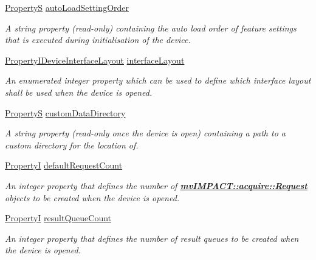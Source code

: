 \begin{DoxyCompactItemize}
\hyperlink{classmv_i_m_p_a_c_t_1_1acquire_1_1_property_s}{Property\+S} \hyperlink{classmv_i_m_p_a_c_t_1_1acquire_1_1_device_a3130a245e1dc22be91511ce6a6bdf957}{auto\+Load\+Setting\+Order}
\begin{DoxyCompactList}\small\item\em A string property {\bfseries }(read-\/only) containing the auto load order of feature settings that is executed during initialisation of the device. \end{DoxyCompactList}\item 
\hyperlink{group___common_interface_gab90d40765ad00c8bd36b05645f3472dc}{Property\+I\+Device\+Interface\+Layout} \hyperlink{classmv_i_m_p_a_c_t_1_1acquire_1_1_device_ab4dd0ecc9d456bb5ddc01d844c9d6f2d}{interface\+Layout}
\begin{DoxyCompactList}\small\item\em An enumerated integer property which can be used to define which interface layout shall be used when the device is opened. \end{DoxyCompactList}\item 
\hyperlink{classmv_i_m_p_a_c_t_1_1acquire_1_1_property_s}{Property\+S} \hyperlink{classmv_i_m_p_a_c_t_1_1acquire_1_1_device_a356137fa9ec71b56e7981276aaf3c4f2}{custom\+Data\+Directory}
\begin{DoxyCompactList}\small\item\em A string property {\bfseries }(read-\/only once the device is open) containing a path to a custom directory for the location of. \end{DoxyCompactList}\item 
\hyperlink{group___common_interface_ga12d5e434238ca242a1ba4c6c3ea45780}{Property\+I} \hyperlink{classmv_i_m_p_a_c_t_1_1acquire_1_1_device_a703ef11aee37b938415a85c9f9256222}{default\+Request\+Count}
\begin{DoxyCompactList}\small\item\em An integer property that defines the number of {\bfseries \hyperlink{classmv_i_m_p_a_c_t_1_1acquire_1_1_request}{mv\+I\+M\+P\+A\+C\+T\+::acquire\+::\+Request}} objects to be created when the device is opened. \end{DoxyCompactList}\item 
\hyperlink{group___common_interface_ga12d5e434238ca242a1ba4c6c3ea45780}{Property\+I} \hyperlink{classmv_i_m_p_a_c_t_1_1acquire_1_1_device_a93878aa300a8cff3dc3c4ef84d5d4276}{result\+Queue\+Count}
\begin{DoxyCompactList}\small\item\em An integer property that defines the number of result queues to be created when the device is opened. \end{DoxyCompactList}\item 

\end{DoxyCompactItemize}
